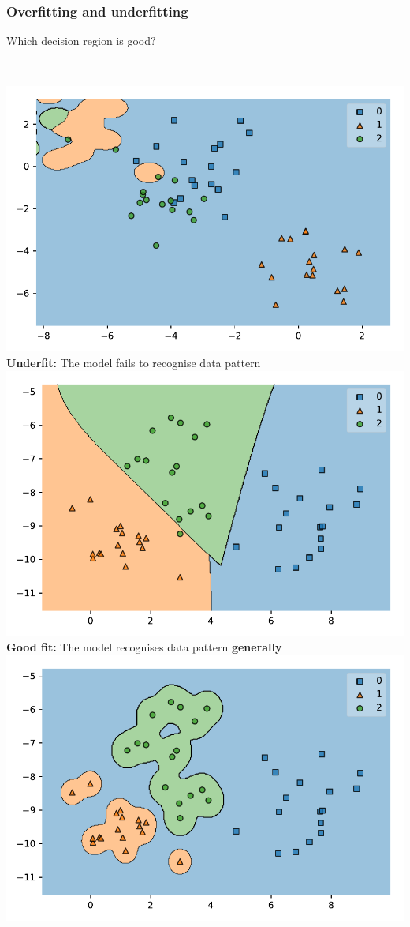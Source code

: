 \documentclass[aspectratio=169]{beamer}
\begin{document}
\begin{frame}
	\frametitle{Overfitting and underfitting}
	Which decision region is good?\\~\\
	\begin{columns}[t]
		 \includegraphics[width=1.0\textwidth]{imgs/underfit.pdf}
		\onslide<2-> \textbf{Underfit: } The model fails to recognise data pattern
		\onslide<1-> \includegraphics[width=1.0\textwidth]{imgs/good.pdf}
		\onslide<4-> \textbf{Good fit: } The model recognises data pattern \textbf{generally}
		\onslide<1-> \includegraphics[width=1.0\textwidth]{imgs/overfit.pdf}

\end{columns}
\end{frame}
\end{document}
